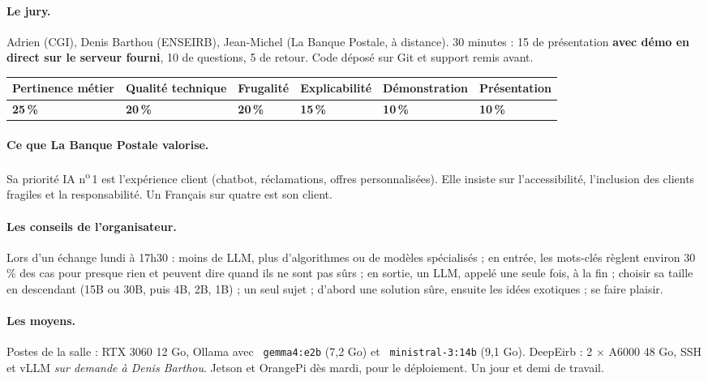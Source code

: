 \documentclass[11pt,a4paper]{article}
\DeclareRobustCommand{\f}[1]{{\texttt{\small
  \renewcommand{\_}{\char`\_\allowbreak}#1}}}
\begin{document}
\paragraph{Le jury.} Adrien (CGI), Denis Barthou (ENSEIRB), Jean-Michel (La Banque Postale, à
distance). 30 minutes : 15 de présentation \textbf{avec démo en direct sur le serveur fourni},
10 de questions, 5 de retour. Code déposé sur Git et support remis avant.

\begin{center}\small
\begin{tabular}{@{}l l l l l l@{}}
\toprule
Pertinence métier & Qualité technique & Frugalité & Explicabilité & Démonstration & Présentation \\
\midrule
\textbf{25\,\%} & \textbf{20\,\%} & \textbf{20\,\%} & \textbf{15\,\%} & \textbf{10\,\%} &
  \textbf{10\,\%} \\
\bottomrule
\end{tabular}
\end{center}

\paragraph{Ce que La Banque Postale valorise.} Sa priorité IA n\textsuperscript{o}\,1 est
l'expérience client (chatbot, réclamations, offres personnalisées). Elle insiste sur
l'accessibilité, l'inclusion des clients fragiles et la responsabilité. Un Français sur quatre est
son client.

\paragraph{Les conseils de l'organisateur.} Lors d'un échange lundi à 17h30 : moins de LLM, plus
d'algorithmes ou de modèles spécialisés ; en entrée, les mots-clés règlent environ 30\,\% des cas
pour presque rien et peuvent dire quand ils ne sont pas sûrs ; en sortie, un LLM, appelé une seule
fois, à la fin ; choisir sa taille en descendant (15B ou 30B, puis 4B, 2B, 1B) ; un seul sujet ;
d'abord une solution sûre, ensuite les idées exotiques ; se faire plaisir.

\paragraph{Les moyens.} Postes de la salle : RTX 3060 12 Go, Ollama avec \f{gemma4:e2b} (7,2 Go)
et \f{ministral-3:14b} (9,1 Go). DeepEirb : 2 $\times$ A6000 48 Go, SSH et vLLM \emph{sur demande
à Denis Barthou}. Jetson et OrangePi dès mardi, pour le déploiement. Un jour et demi de travail.
\end{document}
